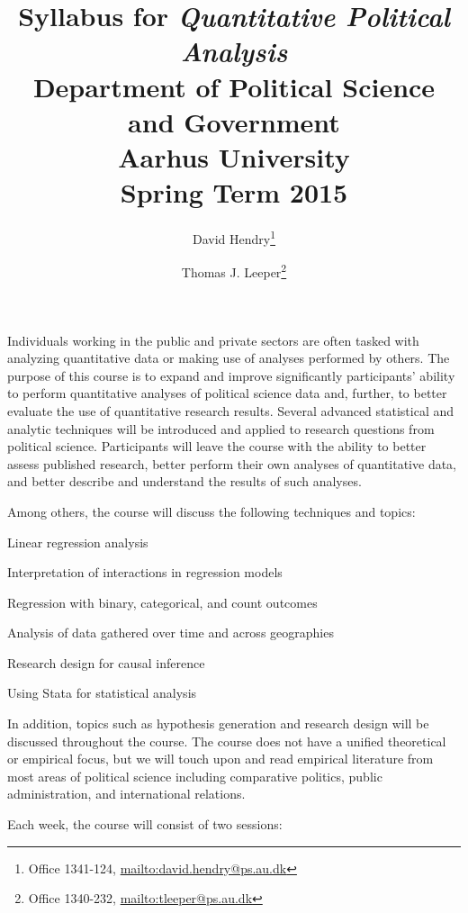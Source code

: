\documentclass[11pt,a4paper]{article}
\title{Syllabus for \textit{Quantitative Political Analysis}\\Department of Political Science and Government\\Aarhus University\\Spring Term 2015}
\author{David Hendry\thanks{Office 1341-124, \url{mailto:david.hendry@ps.au.dk}} \and
Thomas J. Leeper\thanks{Office 1340-232, \url{mailto:tleeper@ps.au.dk}}}
\begin{document}
\nobibliography*

\maketitle

\faketableofcontents


Individuals working in the public and private sectors are often tasked with analyzing quantitative data or making use of analyses performed by others. The purpose of this course is to expand and improve significantly participants' ability to perform quantitative analyses of political science data and, further, to better evaluate the use of quantitative research results. Several advanced statistical and analytic techniques will be introduced and applied to research questions from political science. Participants will leave the course with the ability to better assess published research, better perform their own analyses of quantitative data, and better describe and understand the results of such analyses. 

\vspace{1em}
Among others, the course will discuss the following techniques and topics:

\begin{itemize*}
\item Linear regression analysis
\item Interpretation of interactions in regression models
\item Regression with binary, categorical, and count outcomes
\item Analysis of data gathered over time and across geographies
\item Research design for causal inference 
\item Using Stata for statistical analysis
\end{itemize*}

In addition, topics such as hypothesis generation and research design will be discussed throughout the course. The course does not have a unified theoretical or empirical focus, but we will touch upon and read empirical literature from most areas of political science including comparative politics, public administration, and international relations.

\vspace{1em}
Each week, the course will consist of two sessions:
\end{document}
